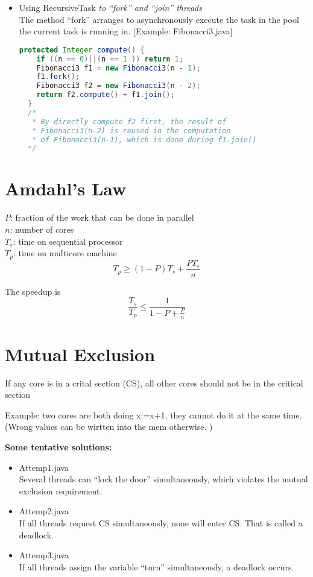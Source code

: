 \documentclass[12pt]{article}
\begin{document}
\begin{enumerate}
\begin{itemize}
\begin{itemize}
\item Using RecursiveTask \textit{to ``fork'' and ``join'' threads} \\
The method ``fork'' arranges to asynchronously execute the task in the pool
the current task is running in. 
[Example: Fibonacci3.java]  \\
\begin{lstlisting}[language=Java]
  protected Integer compute() {
    if ((n == 0)||(n == 1 )) return 1;
    Fibonacci3 f1 = new Fibonacci3(n - 1);
    f1.fork();
    Fibonacci3 f2 = new Fibonacci3(n - 2);
    return f2.compute() + f1.join();
  }
  /* 
   * By directly compute f2 first, the result of 
   * Fibonacci3(n-2) is reused in the computation 
   * of Fibonacci3(n-1), which is done during f1.join()
  */
\end{lstlisting} 
\end{itemize}
\end{itemize}
\end{enumerate} 

\section{Amdahl's Law} 
$P$: fraction of the work that can be done in parallel \\
$n$: number of cores \\
$T_s$: time on sequential processor \\
$T_p$: time on multicore machine \\

$$T_p\geq(1-P)T_s+\frac{PT_s}{n}$$ 

The speedup is 
$$\frac{T_s}{T_p}\leq\frac{1}{1-P+\frac{P}{n}}$$

\section{Mutual Exclusion} 
If any core is in a crital section (CS), all other cores should not be in the
critical section 

Example: two cores are both doing x:=x+1, they cannot do it at the same time.
(Wrong values can be wirtten into the mem otherwise. ) 

\textbf{Some tentative solutions: } 
\begin{itemize} 
\item Attemp1.java  \\ 
Several threads can ``lock the door'' simultaneously, which violates the mutual
exclusion requirement.  
\item Attemp2.java \\
If all threads request CS simultaneously, none will enter CS. That is called a
deadlock. 
\item Attemp3.java \\ 
If all threads assign the variable ``turn'' simultaneously, a deadlock occurs. 
\end{itemize} 
\end{document}
